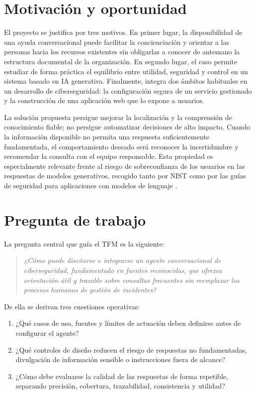 \documentclass[12pt,twoside,titlepage]{book}
\begin{document}
\section{Motivación y oportunidad}
\label{sec:motivacion}

El proyecto se justifica por tres motivos. En primer lugar, la disponibilidad de
una ayuda conversacional puede facilitar la concienciación y orientar a las
personas hacia los recursos existentes sin obligarlas a conocer de antemano la
estructura documental de la organización. En segundo lugar, el caso permite
estudiar de forma práctica el equilibrio entre utilidad, seguridad y control en
un sistema basado en IA generativa. Finalmente, integra dos ámbitos habituales
en un desarrollo de ciberseguridad: la configuración segura de un servicio
gestionado y la construcción de una aplicación web que lo expone a usuarios.

La solución propuesta persigue mejorar la localización y la comprensión de
conocimiento fiable; no persigue automatizar decisiones de alto impacto. Cuando
la información disponible no permita una respuesta suficientemente fundamentada,
el comportamiento deseado será reconocer la incertidumbre y recomendar la
consulta con el equipo responsable. Esta propiedad es especialmente relevante
frente al riesgo de sobreconfianza de los usuarios en las respuestas de modelos
generativos, recogido tanto por NIST como por las guías de seguridad para
aplicaciones con modelos de lenguaje \cite{nistGenAi2024,owaspLlm2026}.

\section{Pregunta de trabajo}
\label{sec:pregunta-trabajo}

La pregunta central que guía el TFM es la siguiente:

\begin{quote}
\emph{¿Cómo puede diseñarse e integrarse un agente conversacional de
ciberseguridad, fundamentado en fuentes reconocidas, que ofrezca orientación
útil y trazable sobre consultas frecuentes sin reemplazar los procesos humanos
de gestión de incidentes?}
\end{quote}

De ella se derivan tres cuestiones operativas:

\begin{enumerate}
  \item ¿Qué casos de uso, fuentes y límites de actuación deben definirse antes
  de configurar el agente?
  \item ¿Qué controles de diseño reducen el riesgo de respuestas no
  fundamentadas, divulgación de información sensible o instrucciones fuera de
  alcance?
  \item ¿Cómo debe evaluarse la calidad de las respuestas de forma repetible,
  separando precisión, cobertura, trazabilidad, consistencia y utilidad?
\end{enumerate}
\end{document}
